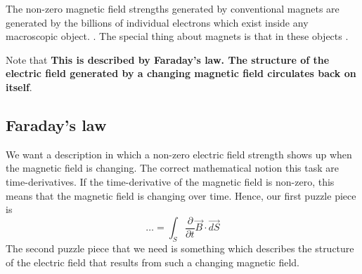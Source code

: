 The non-zero magnetic field strengths generated by conventional magnets are generated by the billions of individual electrons which exist inside any macroscopic object. \textbf{}. The special thing about magnets is that in these objects \textbf{}.

Note that \textbf{ This is described by Faraday's law. The structure of the electric field generated by a changing magnetic field circulates back on itself}.

\subsection{Faraday's law}
We want a description in which a non-zero electric field strength shows up when the magnetic field is changing. The correct mathematical notion this task are time-derivatives. If the time-derivative of the magnetic field is non-zero, this means that the magnetic field is changing over time. Hence, our first puzzle piece is
$$
\dots=\int_{S} \frac{\partial}{\partial t} \vec{B} \cdot \overrightarrow{d S}
$$
The second puzzle piece that we need is something which describes the structure of the electric field that results from such a changing magnetic field.

